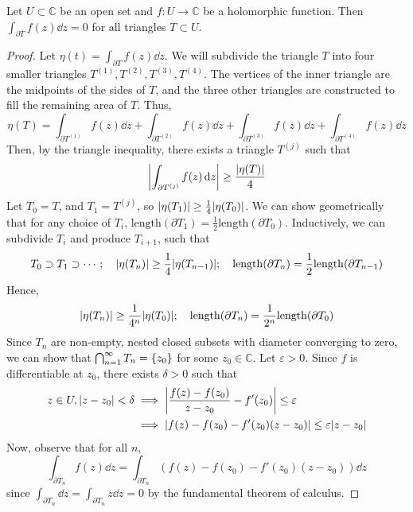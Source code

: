 \begin{theorem}
	Let \( U \subset \mathbb C \) be an open set and \( f \colon U \to \mathbb C \) be a holomorphic function.
	Then \( \int_{\partial T} f(z) \dd{z} = 0 \) for all triangles \( T \subset U \).
\end{theorem}
\begin{proof}
	Let \( \eta(t) = \int_{\partial T} f(z) \dd{z} \).
	We will subdivide the triangle \( T \) into four smaller triangles \( T^{(1)}, T^{(2)}, T^{(3)}, T^{(4)} \).
	The vertices of the inner triangle are the midpoints of the sides of \( T \), and the three other triangles are constructed to fill the remaining area of \( T \).
	Thus,
	\[
		\eta(T) = \int_{\partial T^{(1)}} f(z) \dd{z} + \int_{\partial T^{(2)}} f(z) \dd{z} + \int_{\partial T^{(3)}} f(z) \dd{z} + \int_{\partial T^{(4)}} f(z) \dd{z}
	\]
	Then, by the triangle inequality, there exists a triangle \( T^{(j)} \) such that
	\[
		\abs{\int_{\partial T^{(j)}} f(z) \dd{z}} \geq \frac{\abs{\eta(T)}}{4}
	\]
	Let \( T_0 = T \), and \( T_1 = T^{(j)} \), so \( \abs{\eta(T_1)} \geq \frac{1}{4}\abs{\eta(T_0)} \).
	We can show geometrically that for any choice of \( T_i \), \( \mathrm{length}(\partial T_1) = \frac{1}{2}\mathrm{length}(\partial T_0) \).
	Inductively, we can subdivide \( T_i \) and produce \( T_{i+1} \), such that
	\[
		T_0 \supset T_1 \supset \cdots;\quad \abs{\eta(T_n)} \geq \frac{1}{4}\abs{\eta(T_{n-1})};\quad \mathrm{length}(\partial T_n) = \frac{1}{2} \mathrm{length}(\partial T_{n-1})
	\]
	Hence,
	\[
		\abs{\eta(T_n)} \geq \frac{1}{4^n}\abs{\eta(T_0)};\quad \mathrm{length}(\partial T_n) = \frac{1}{2^n} \mathrm{length}(\partial T_0)
	\]
	Since \( T_n \) are non-empty, nested closed subsets with diameter converging to zero, we can show that \( \bigcap_{n=1}^\infty T_n = \qty{z_0} \) for some \( z_0 \in \mathbb C \).
	Let \( \varepsilon > 0 \).
	Since \( f \) is differentiable at \( z_0 \), there exists \( \delta > 0 \) such that
	\begin{align*}
		z \in U, \abs{z - z_0} < \delta & \implies \abs{\frac{f(z) - f(z_0)}{z - z_0} - f'(z_0)} \leq \varepsilon        \\
		                                & \implies \abs{f(z) - f(z_0) - f'(z_0)(z - z_0)} \leq \varepsilon \abs{z - z_0}
	\end{align*}
	Now, observe that for all \( n \),
	\[
		\int_{\partial T_n} f(z) \dd{z} = \int_{\partial T_n} (f(z) - f(z_0) - f'(z_0)(z - z_0)) \dd{z}
	\]
	since \( \int_{\partial T_n} \dd{z} = \int_{\partial T_n} z \dd{z} = 0 \) by the fundamental theorem of calculus.

\end{proof}
